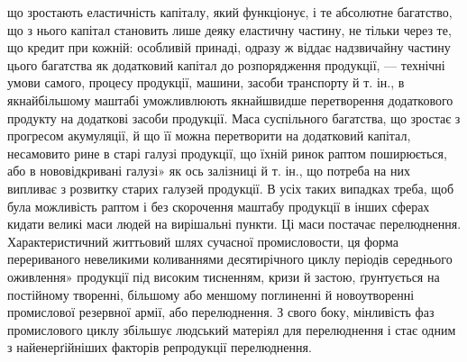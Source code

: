 що зростають еластичність капіталу, який функціонує, і те абсолютне
багатство, що з нього капітал становить лише деяку
еластичну частину, не тільки через те, що кредит при кожній:
особливій принаді, одразу ж віддає надзвичайну частину цього
багатства як додатковий капітал до розпорядження продукції,
— технічні умови самого, процесу продукції, машини, засоби
транспорту й т. ін., в якнайбільшому маштабі уможливлюють
якнайшвидше перетворення додаткового продукту на
додаткові засоби продукції. Маса суспільного багатства, що зростає
з прогресом акумуляції, й що її можна перетворити на додатковий
капітал, несамовито рине в старі галузі продукції, що
їхній ринок раптом поширюється, або в нововідкривані галузі»
як ось залізниці й т. ін., що потреба на них випливає з розвитку
старих галузей продукції. В усіх таких випадках треба, щоб була
можливість раптом і без скорочення маштабу продукції в інших
сферах кидати великі маси людей на вирішальні пункти. Ці
маси постачає перелюднення. Характеристичний життьовий шлях
сучасної промисловости, ця форма перериваного невеликими
коливаннями десятирічного циклу періодів середнього оживлення»
продукції під високим тисненням, кризи й застою, ґрунтується
на постійному творенні, більшому або меншому поглиненні й
новоутворенні промислової резервної армії, або перелюднення.
З свого боку, мінливість фаз промислового циклу збільшує
людський матеріял для перелюднення і стає одним з найенерґійніших
факторів репродукції перелюднення.


